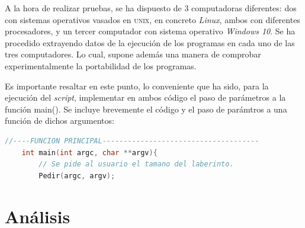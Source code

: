 \documentclass[12pt,a4paper]{article}
\begin{document}
\vspace{0.3cm}
A la hora de realizar pruebas, se ha dispuesto de 3 computadoras diferentes: dos  con sistemas operativos vasados en \textsc{unix}, en concreto \textit{Linux}, ambos con diferentes procesadores, y un tercer computador con sistema operativo \textit{Windows 10}. Se ha procedido extrayendo datos de la ejecución de los programas en cada uno de las tres computadores. Lo cual, supone además una manera de comprobar experimentalmente la portabilidad de los programas.

Es importante resaltar en este punto, lo conveniente que ha sido, para la ejecución del \textit{script}, implementar en ambos código el paso de parámetros a la función \textsf{main()}. Se incluye brevemente el código y el paso de parámtros a una función de dichos argumentos:
\lstset{style=mystyle}
\begin{lstlisting}[language=C++, title= Implementación de paso de argumentos al \textsf{main()}, frame=single, numbers=none]
	//----FUNCION PRINCIPAL-------------------------------------
	int main(int argc, char **argv){
		// Se pide al usuario el tamano del laberinto.
  		Pedir(argc, argv);
\end{lstlisting}

\section{Análisis}
\end{document}

